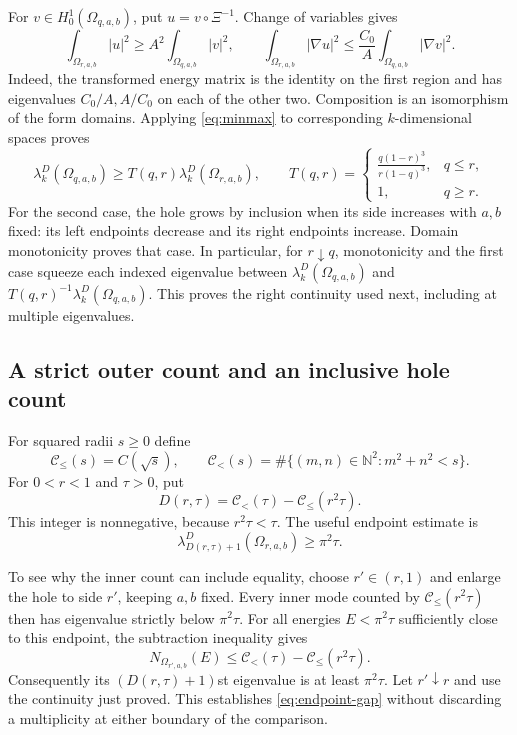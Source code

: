 \documentclass[11pt,reqno]{amsart}
\numberwithin{equation}{section}
\newcommand{\N}{\mathbb N}
\newcommand{\Om}{\Omega}
\begin{document}
For $v\in H^1_0(\Om_{q,a,b})$, put $u=v\circ\Xi^{-1}$.
Change of variables gives
\[
 \int_{\Om_{r,a,b}}|u|^2\ge A^2\int_{\Om_{q,a,b}}|v|^2,
 \qquad
 \int_{\Om_{r,a,b}}|\nabla u|^2
 \le\frac{C_0}{A}\int_{\Om_{q,a,b}}|\nabla v|^2.
\]
Indeed, the transformed energy matrix is the identity on the
first region and has eigenvalues $C_0/A,A/C_0$ on each of
the other two. Composition is an isomorphism of the form
domains. Applying \eqref{eq:minmax} to corresponding
$k$-dimensional spaces proves
\begin{equation}\label{eq:transport}
 \lambda_k^D(\Om_{q,a,b})\ge T(q,r)\lambda_k^D(\Om_{r,a,b}),
 \qquad
 T(q,r)=
 \begin{cases}
 \displaystyle\frac{q(1-r)^3}{r(1-q)^3},&q\le r,\\[3pt]
 1,&q\ge r.
 \end{cases}
\end{equation}
For the second case, the hole grows by inclusion when its side
increases with $a,b$ fixed: its left endpoints decrease and its
right endpoints increase. Domain monotonicity proves that case.
In particular, for $r\downarrow q$, monotonicity and the first
case squeeze each indexed eigenvalue between
$\lambda_k^D(\Om_{q,a,b})$ and
$T(q,r)^{-1}\lambda_k^D(\Om_{q,a,b})$. This proves the right
continuity used next, including at multiple eigenvalues.

\subsection*{A strict outer count and an inclusive hole count}

For squared radii $s\ge0$ define
\[
 \mathcal C_{\le}(s)=C(\sqrt s),\qquad
 \mathcal C_{<}(s)=\#\{(m,n)\in\N^2:m^2+n^2<s\}.
\]
For $0<r<1$ and $\tau>0$, put
\begin{equation}\label{eq:gap-index}
 D(r,\tau)=\mathcal C_{<}(\tau)-\mathcal C_{\le}(r^2\tau).
\end{equation}
This integer is nonnegative, because $r^2\tau<\tau$.
The useful endpoint estimate is
\begin{equation}\label{eq:endpoint-gap}
 \lambda_{D(r,\tau)+1}^D(\Om_{r,a,b})\ge\pi^2\tau.
\end{equation}

To see why the inner count can include equality, choose
$r'\in(r,1)$ and enlarge the hole to side $r'$, keeping $a,b$
fixed. Every inner mode
counted by $\mathcal C_{\le}(r^2\tau)$ then has eigenvalue
strictly below $\pi^2\tau$. For all energies $E<\pi^2\tau$
sufficiently close to this endpoint, the subtraction inequality
gives
\[
 N_{\Om_{r',a,b}}(E)
 \le\mathcal C_{<}(\tau)-\mathcal C_{\le}(r^2\tau).
\]
Consequently its $(D(r,\tau)+1)$st eigenvalue is at least
$\pi^2\tau$. Let $r'\downarrow r$ and use the continuity
just proved. This establishes \eqref{eq:endpoint-gap} without
discarding a multiplicity at either boundary of the comparison.
\end{document}
